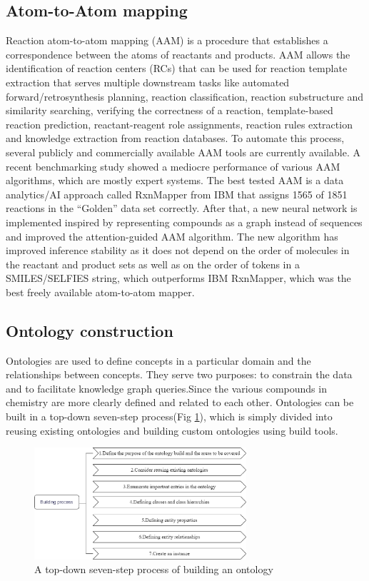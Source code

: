 \documentclass[%
 aip,
 jmp,%
 amsmath,amssymb,
 reprint,%
]{revtex4-2}
\begin{document}
\subsection{Atom-to-Atom mapping}
Reaction atom-to-atom mapping (AAM) is a procedure that establishes a correspondence between the atoms of 
reactants and products. AAM allows the identification of reaction centers (RCs) that can be used for reaction template 
extraction that serves multiple downstream tasks like automated forward/retrosynthesis planning, 
reaction classification, reaction substructure and similarity searching, verifying the correctness of a reaction, template-based reaction prediction, 
reactant-reagent role assignments, reaction rules extraction and knowledge extraction from reaction databases. 
To automate this process, several publicly and commercially available AAM tools are currently available. 
A recent benchmarking study showed a mediocre performance of 
various AAM algorithms, which are mostly expert systems. The best tested AAM is a data analytics/AI 
approach called RxnMapper\cite{schwaller2020unsupervised} from IBM that assigns 1565 of 1851 reactions in the “Golden” data set correctly.
After that, a new neural network is implemented inspired by representing compounds as a graph 
instead of sequences and improved the attention-guided AAM algorithm\cite{nugmanov2022bidirectional}. The new algorithm has improved 
inference stability as it does not depend on the order of molecules in the reactant and product 
sets as well as on the order of tokens in a SMILES/SELFIES string, which outperforms IBM RxnMapper, 
which was the best freely available atom-to-atom mapper.

\subsection{Ontology construction}
Ontologies are used to define concepts in a particular domain and the relationships between concepts. They serve two purposes: to constrain 
the data and to facilitate knowledge graph queries.Since the various compounds in chemistry are more clearly defined and related to each other.
Ontologies can be built in a top-down seven-step process(Fig \ref{ Fig.4 }), which is simply divided 
into reusing existing ontologies and building custom ontologies using build tools.
\begin{figure}[htbp]
 \centering
 \includegraphics[width=0.7\textwidth]{figure/4.png}
 \caption{ A top-down seven-step process of building an ontology }
 \label{ Fig.4 }
\end{figure}
\end{document}
